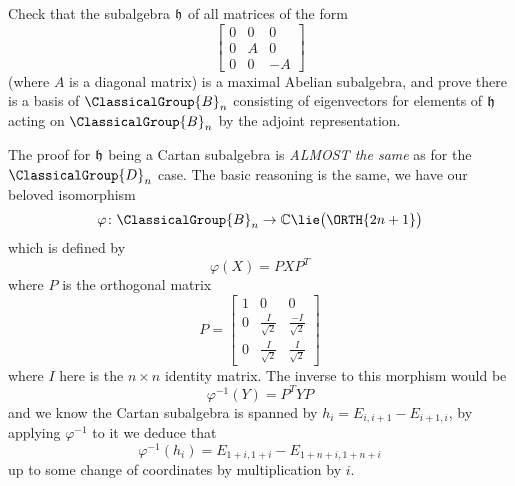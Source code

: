 \begin{exercise}
Check that the subalgebra $\frak{h}$ of all matrices of the form
\begin{equation}
\begin{bmatrix}0&0&0\\
0&A&0\\
0&0&-A
\end{bmatrix}
\end{equation}
(where $A$ is a diagonal matrix) is a maximal Abelian subalgebra,
and prove there is a basis of $\ClassicalGroup{B}_{n}$ consisting of eigenvectors
for elements of $\frak{h}$ acting on $\ClassicalGroup{B}_{n}$ by the adjoint
representation.
\end{exercise}
\answer The proof for $\frak{h}$ being a Cartan subalgebra is
\emph{ALMOST the same} as for the $\ClassicalGroup{D}_{n}$ case. The basic
reasoning is the same, we have our beloved isomorphism
\begin{equation}
\varphi\colon \ClassicalGroup{B}_{n}\to\Bbb{C}\lie\big(\ORTH{2n+1}\big)
\end{equation}
which is defined by
\begin{equation}
\varphi(X)=PXP^{T}
\end{equation}
where $P$ is the orthogonal matrix
\begin{equation}
P = \begin{bmatrix}1&0&0\\
0&\frac{I}{\sqrt{2}}&\frac{-I}{\sqrt{2}}\\
0&\frac{I}{\sqrt{2}}&\frac{I}{\sqrt{2}}
\end{bmatrix}
\end{equation}
where $I$ here is the $n\times n$ identity matrix.
The inverse to this morphism would be
\begin{equation}
\varphi^{-1}(Y)=P^{T}YP
\end{equation}
and we know the Cartan subalgebra is spanned by
$h_{i}=E_{i,i+1}-E_{i+1,i}$, by applying $\varphi^{-1}$ to it we
deduce that
\begin{equation}
\varphi^{-1}(h_{i})=E_{1+i,1+i}-E_{1+n+i,1+n+i}
\end{equation}
up to some change of coordinates by multiplication by $i$.


